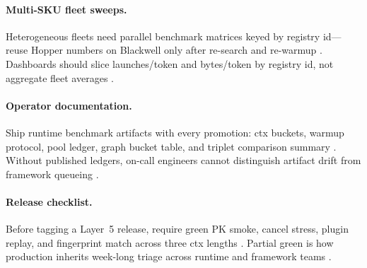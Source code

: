 \paragraph{Multi-SKU fleet sweeps.} Heterogeneous fleets need parallel benchmark matrices keyed by registry id---reuse Hopper numbers on Blackwell only after re-search and re-warmup \citep{yirage2026,chen2020compilerbasedhardw,nvidia2022hopper,semianalysis2024tma,patel2025llminference,amd2024xdna,amd2024aie,taxbreak2026,memoryfloor2026,kwon2023vllm,liu2024deepseekv3,nvidia2024cudagraphs,dao2022flashattention,dao2023flashdecoding,dlbook}. Dashboards should slice launches/token and bytes/token by registry id, not aggregate fleet averages \citep{patel2025llminference,yirage2026,chen2020compilerbasedhardw,memoryfloor2026,taxbreak2026,kwon2023vllm,liu2024deepseekv3,nvidia2024cudagraphs,dao2022flashattention,amd2024aie,amd2024xdna,dao2023flashdecoding,nvidia2022hopper,semianalysis2024tma,dlbook}.

\paragraph{Operator documentation.} Ship runtime benchmark artifacts with every promotion: ctx buckets, warmup protocol, pool ledger, graph bucket table, and triplet comparison summary \citep{yirage2026,chen2020compilerbasedhardw,patel2025llminference,taxbreak2026,memoryfloor2026,kwon2023vllm,liu2024deepseekv3,nvidia2024cudagraphs,dao2022flashattention,amd2024xdna,amd2024aie,dao2023flashdecoding,nvidia2022hopper,semianalysis2024tma,dlbook}. Without published ledgers, on-call engineers cannot distinguish artifact drift from framework queueing \citep{patel2025llminference,yirage2026,chen2020compilerbasedhardw,kwon2023vllm,memoryfloor2026,taxbreak2026,liu2024deepseekv3,nvidia2024cudagraphs,dao2022flashattention,amd2024aie,amd2024xdna,dao2023flashdecoding,nvidia2022hopper,semianalysis2024tma,dlbook}.

\paragraph{Release checklist.} Before tagging a Layer~5 release, require green PK smoke, cancel stress, plugin replay, and fingerprint match across three ctx lengths \citep{yirage2026,chen2020compilerbasedhardw,patel2025llminference,taxbreak2026,memoryfloor2026,kwon2023vllm,liu2024deepseekv3,nvidia2024cudagraphs,dao2022flashattention,amd2024xdna,amd2024aie,dao2023flashdecoding,nvidia2022hopper,semianalysis2024tma,dlbook}. Partial green is how production inherits week-long triage across runtime and framework teams \citep{memoryfloor2026,taxbreak2026,yirage2026,patel2025llminference,chen2020compilerbasedhardw,kwon2023vllm,liu2024deepseekv3,nvidia2024cudagraphs,dao2022flashattention,amd2024aie,amd2024xdna,dao2023flashdecoding,nvidia2022hopper,semianalysis2024tma,dlbook}.


